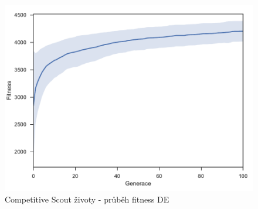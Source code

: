 \begin{figure}[p]\centering
	\includegraphics[width=\columnwidth]{../img/CompetitiveMap/ScoutKeep}
	\caption{Competitive Scout životy - průběh fitness DE}
	\label{obr04:CompetitiveKeep}
\end{figure}
\clearpage
